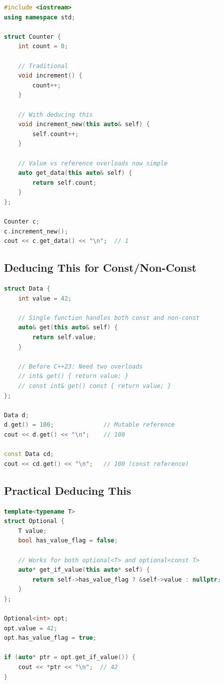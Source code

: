 \begin{lstlisting}[language={C++}]
#include <iostream>
using namespace std;

struct Counter {
    int count = 0;
    
    // Traditional
    void increment() {
        count++;
    }
    
    // With deducing this
    void increment_new(this auto& self) {
        self.count++;
    }
    
    // Value vs reference overloads now simple
    auto get_data(this auto& self) {
        return self.count;
    }
};

Counter c;
c.increment_new();
cout << c.get_data() << "\n";  // 1
\end{lstlisting}

\hypertarget{deducing-this-for-constnon-const}{%
\subsection{Deducing This for
Const/Non-Const}\label{deducing-this-for-constnon-const}}

\begin{lstlisting}[language={C++}]
struct Data {
    int value = 42;
    
    // Single function handles both const and non-const
    auto& get(this auto& self) {
        return self.value;
    }
    
    // Before C++23: Need two overloads
    // int& get() { return value; }
    // const int& get() const { return value; }
};

Data d;
d.get() = 100;              // Mutable reference
cout << d.get() << "\n";    // 100

const Data cd;
cout << cd.get() << "\n";   // 100 (const reference)
\end{lstlisting}

\hypertarget{practical-deducing-this}{%
\subsection{Practical Deducing This}\label{practical-deducing-this}}

\begin{lstlisting}[language={C++}]
template<typename T>
struct Optional {
    T value;
    bool has_value_flag = false;
    
    // Works for both optional<T> and optional<const T>
    auto* get_if_value(this auto* self) {
        return self->has_value_flag ? &self->value : nullptr;
    }
};

Optional<int> opt;
opt.value = 42;
opt.has_value_flag = true;

if (auto* ptr = opt.get_if_value()) {
    cout << *ptr << "\n";  // 42
}
\end{lstlisting}

